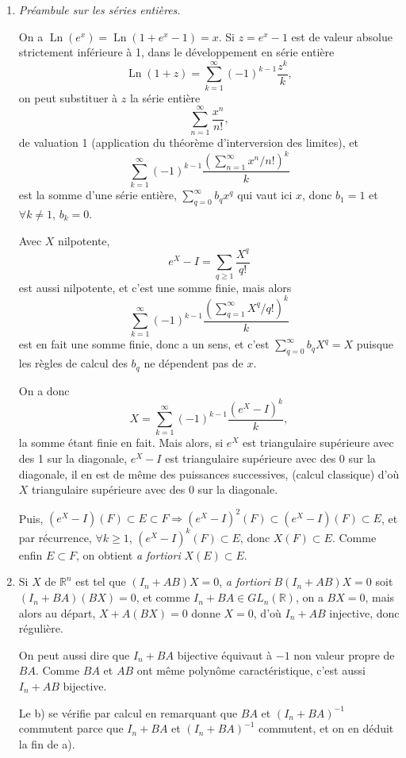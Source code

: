 \begin{enumerate}[label=\arabic*.,leftmargin=2.2em,itemsep=1.2em]

\item \emph{Préambule sur les séries entières.}

On a $\operatorname{Ln}(e^x)=\operatorname{Ln}(1+e^x-1)=x$. Si $z=e^x-1$ est de valeur absolue strictement inférieure à 1, dans le développement en série entière
\[
\operatorname{Ln}(1+z)=\sum_{k=1}^{\infty}(-1)^{k-1}\frac{z^k}{k},
\]
on peut substituer à $z$ la série entière
\[
\sum_{n=1}^{\infty}\frac{x^n}{n!},
\]
de valuation 1 (application du théorème d'interversion des limites), et
\[
\sum_{k=1}^{\infty}(-1)^{k-1}\frac{\left(\sum_{n=1}^{\infty}x^n/n!\right)^k}{k}
\]
est la somme d'une série entière, $\sum_{q=0}^{\infty}b_qx^q$ qui vaut ici $x$, donc $b_1=1$ et $\forall k\ne1$, $b_k=0$.

Avec $X$ nilpotente,
\[
e^X-I=\sum_{q\ge1}\frac{X^q}{q!}
\]
est aussi nilpotente, et c'est une somme finie, mais alors
\[
\sum_{k=1}^{\infty}(-1)^{k-1}\frac{\left(\sum_{q=1}^{\infty}X^q/q!\right)^k}{k}
\]
est en fait une somme finie, donc a un sens, et c'est $\sum_{q=0}^{\infty}b_qX^q=X$ puisque les règles de calcul des $b_q$ ne dépendent pas de $x$.

On a donc
\[
X=\sum_{k=1}^{\infty}(-1)^{k-1}\frac{(e^X-I)^k}{k},
\]
la somme étant finie en fait. Mais alors, si $e^X$ est triangulaire supérieure avec des 1 sur la diagonale, $e^X-I$ est triangulaire supérieure avec des 0 sur la diagonale, il en est de même des puissances successives, (calcul classique) d'où $X$ triangulaire supérieure avec des 0 sur la diagonale.

Puis, $(e^X-I)(F)\subset E\subset F\Rightarrow(e^X-I)^2(F)\subset(e^X-I)(F)\subset E$, et par récurrence, $\forall k\ge1$, $(e^X-I)^k(F)\subset E$, donc $X(F)\subset E$. Comme enfin $E\subset F$, on obtient \emph{a fortiori} $X(E)\subset E$.

\item Si $X$ de $\mathbb R^n$ est tel que $(I_n+AB)X=0$, \emph{a fortiori} $B(I_n+AB)X=0$ soit $(I_n+BA)(BX)=0$, et comme $I_n+BA\in GL_n(\mathbb R)$, on a $BX=0$, mais alors au départ, $X+A(BX)=0$ donne $X=0$, d'où $I_n+AB$ injective, donc régulière.

On peut aussi dire que $I_n+BA$ bijective équivaut à $-1$ non valeur propre de $BA$. Comme $BA$ et $AB$ ont même polynôme caractéristique, c'est aussi $I_n+AB$ bijective.

Le b) se vérifie par calcul en remarquant que $BA$ et $(I_n+BA)^{-1}$ commutent parce que $I_n+BA$ et $(I_n+BA)^{-1}$ commutent, et on en déduit la fin de a).


\end{enumerate}
